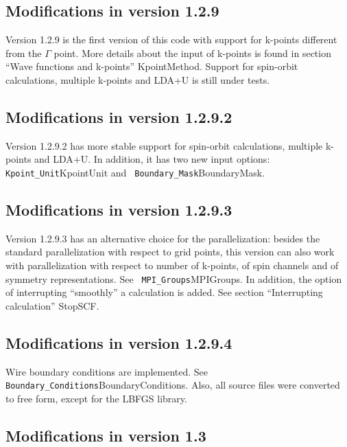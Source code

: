 \documentclass{article}
\begin{document}
\subsection{Modifications in version 1.2.9}

Version 1.2.9 is the first version of this code with support for k-points
different from the $\Gamma$ point. More details about the input of
k-points is found in section
{``Wave functions and k-points'' }{KpointMethod}. Support for
spin-orbit calculations, multiple k-points and LDA+U is still under
tests.

\subsection{Modifications in version 1.2.9.2}

Version 1.2.9.2 has more stable support for spin-orbit calculations,
multiple k-points and LDA+U. In addition, it has two new input
options: {\tt Kpoint\_Unit}{KpointUnit} and {\tt
  Boundary\_Mask}{BoundaryMask}.

\subsection{Modifications in version 1.2.9.3}

Version 1.2.9.3 has an alternative choice for the parallelization:
besides the standard parallelization with respect to grid points, this
version can also work with parallelization with respect to number of
k-points, of spin channels and of symmetry representations. See {\tt
  MPI\_Groups}{MPIGroups}. In addition, the option of interrupting
``smoothly'' a calculation is added. See section { ``Interrupting
  calculation''} {StopSCF}.

\subsection{Modifications in version 1.2.9.4}

Wire boundary conditions are implemented. See {\tt
  Boundary\_Conditions}{BoundaryConditions}. Also, all source files
  were converted to free form, except for the LBFGS library.

\subsection{Modifications in version 1.3}
\end{document}
